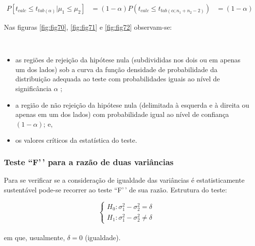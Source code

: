 \documentclass[
]{book}
\providecommand{\tightlist}{%
  \setlength{\itemsep}{0pt}\setlength{\parskip}{0pt}}
\begin{document}
\hfill\break

\begin{align*}
P[t_{calc} \le {t}_{tab\left(\alpha \right)}|\mu_{1} \le \mu_{2}] &  =(1-\alpha)  
P( t_{calc}  \le {t}_{tab\left(\alpha;{n}_{1}+{n}_{2}-2\right)})  & = (1-\alpha) 
\end{align*}

\hfill\break

Nas figuras \ref{fig:fig70}, \ref{fig:fig71} e \ref{fig:fig72} observam-se:

~

\begin{itemize}
\tightlist
\item
  as regiões de rejeição da hipótese nula (subdivididas nos dois ou em apenas um dos lados) sob a curva da função densidade de probabilidade da distribuição adequada ao teste com probabilidades iguais ao nível de significância \(\alpha\) ;\\
\item
  a região de não rejeição da hipótese nula (delimitada à esquerda e à direita ou apenas em um dos lados) com probabilidade igual ao nível de confiança \((1-\alpha)\); e,\\
\item
  os valores críticos da estatística do teste.
\end{itemize}

\hfill\break

\hypertarget{teste-f-para-a-razuxe3o-de-duas-variuxe2ncias}{%
\subsubsection{Teste ``F'\,' para a razão de duas variâncias}\label{teste-f-para-a-razuxe3o-de-duas-variuxe2ncias}}

\hfill\break

Para se verificar se a consideração de igualdade das variâncias é estatisticamente sustentável pode-se recorrer ao teste ``F'\,' de sua razão. Estrutura do teste:

\hfill\break

\[
\begin{cases}
    H_{0}: \sigma_{1}^{2}-\sigma_{2}^{2}=\delta \\
    H_{1}: \sigma_{1}^{2} - \sigma_{2}^{2} \ne \delta
\end{cases}
\]\\

em que, usualmente, \(\delta=0\) (igualdade).

\hfill\break
\end{document}
